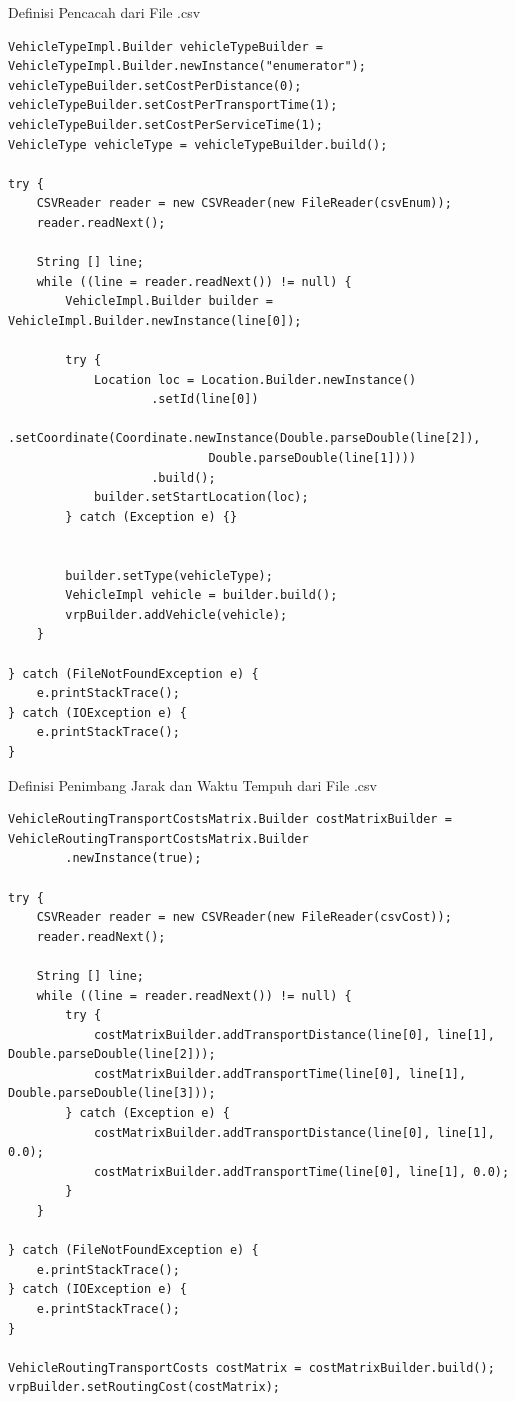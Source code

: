 \begin{listing}
	\caption{Definisi Pencacah dari File .csv}
	\label{lst:jsprit_define_enumerators}
	\begin{verbatim}
VehicleTypeImpl.Builder vehicleTypeBuilder = VehicleTypeImpl.Builder.newInstance("enumerator");
vehicleTypeBuilder.setCostPerDistance(0);
vehicleTypeBuilder.setCostPerTransportTime(1);
vehicleTypeBuilder.setCostPerServiceTime(1);
VehicleType vehicleType = vehicleTypeBuilder.build();

try {
    CSVReader reader = new CSVReader(new FileReader(csvEnum));
    reader.readNext();

    String [] line;
    while ((line = reader.readNext()) != null) {
        VehicleImpl.Builder builder = VehicleImpl.Builder.newInstance(line[0]);

        try {
            Location loc = Location.Builder.newInstance()
                    .setId(line[0])
                    .setCoordinate(Coordinate.newInstance(Double.parseDouble(line[2]),
                            Double.parseDouble(line[1])))
                    .build();
            builder.setStartLocation(loc);
        } catch (Exception e) {}


        builder.setType(vehicleType);
        VehicleImpl vehicle = builder.build();
        vrpBuilder.addVehicle(vehicle);
    }

} catch (FileNotFoundException e) {
    e.printStackTrace();
} catch (IOException e) {
    e.printStackTrace();
}
	\end{verbatim}
\end{listing}


\begin{listing}
	\caption{Definisi Penimbang Jarak dan Waktu Tempuh dari File .csv}
	\label{lst:jsprit_define_route_weights}
	\begin{verbatim}
VehicleRoutingTransportCostsMatrix.Builder costMatrixBuilder = VehicleRoutingTransportCostsMatrix.Builder
        .newInstance(true);

try {
    CSVReader reader = new CSVReader(new FileReader(csvCost));
    reader.readNext();

    String [] line;
    while ((line = reader.readNext()) != null) {
        try {
            costMatrixBuilder.addTransportDistance(line[0], line[1], Double.parseDouble(line[2]));
            costMatrixBuilder.addTransportTime(line[0], line[1], Double.parseDouble(line[3]));
        } catch (Exception e) {
            costMatrixBuilder.addTransportDistance(line[0], line[1], 0.0);
            costMatrixBuilder.addTransportTime(line[0], line[1], 0.0);
        }
    }

} catch (FileNotFoundException e) {
    e.printStackTrace();
} catch (IOException e) {
    e.printStackTrace();
}

VehicleRoutingTransportCosts costMatrix = costMatrixBuilder.build();
vrpBuilder.setRoutingCost(costMatrix);
	\end{verbatim}
\end{listing}


